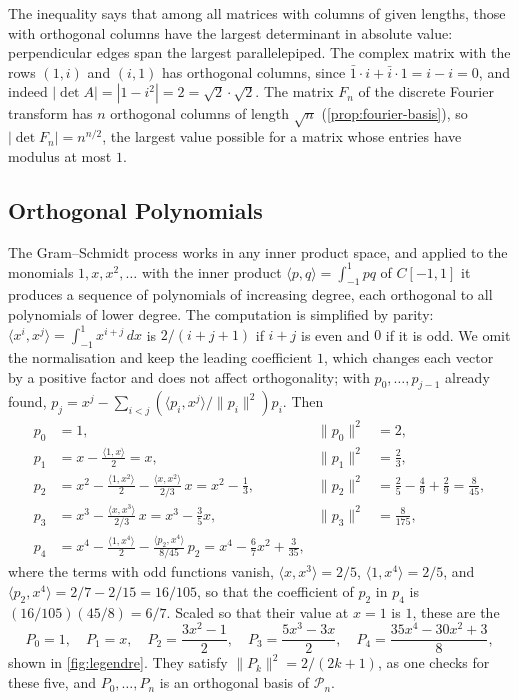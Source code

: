 The inequality says that among all matrices with columns of given lengths, those with orthogonal columns have the largest determinant in absolute value: perpendicular edges span the largest parallelepiped. The complex matrix with the rows $(1,i)$ and $(i,1)$ has orthogonal columns, since $\bar1\cdot i+\bar i\cdot1=i-i=0$, and indeed $|\det A|=|1-i^2|=2=\sqrt2\cdot\sqrt2$. The matrix $F_n$ of the discrete Fourier transform has $n$ orthogonal columns of length $\sqrt n$ (\cref{prop:fourier-basis}), so $|\det F_n|=n^{n/2}$, the largest value possible for a matrix whose entries have modulus at most $1$.

\subsection{Orthogonal Polynomials}
\label{subsec:legendre}

The Gram--Schmidt process works in any inner product space, and applied to the monomials $1,x,x^2,\ldots$ with the inner product $\langle p,q\rangle=\int_{-1}^1pq$ of $C[-1,1]$ it produces a sequence of polynomials of increasing degree, each orthogonal to all polynomials of lower degree. The computation is simplified by parity: $\langle x^i,x^j\rangle=\int_{-1}^1x^{i+j}\,dx$ is $2/(i+j+1)$ if $i+j$ is even and $0$ if it is odd. We omit the normalisation and keep the leading coefficient $1$, which changes each vector by a positive factor and does not affect orthogonality; with $p_0,\ldots,p_{j-1}$ already found, $p_j=x^j-\sum_{i<j}(\langle p_i,x^j\rangle/\|p_i\|^2)p_i$. Then
\[
\begin{aligned}
p_0&=1, & \|p_0\|^2&=2,\\
p_1&=x-\frac{\langle1,x\rangle}2=x, & \|p_1\|^2&=\tfrac23,\\
p_2&=x^2-\frac{\langle1,x^2\rangle}2-\frac{\langle x,x^2\rangle}{2/3}\,x=x^2-\frac13, & \|p_2\|^2&=\tfrac25-\tfrac49+\tfrac29=\tfrac8{45},\\
p_3&=x^3-\frac{\langle x,x^3\rangle}{2/3}\,x=x^3-\frac35x, & \|p_3\|^2&=\tfrac8{175},\\
p_4&=x^4-\frac{\langle1,x^4\rangle}2-\frac{\langle p_2,x^4\rangle}{8/45}\,p_2=x^4-\frac67x^2+\frac3{35} ,
\end{aligned}
\]
where the terms with odd functions vanish, $\langle x,x^3\rangle=2/5$, $\langle1,x^4\rangle=2/5$, and $\langle p_2,x^4\rangle=2/7-2/15=16/105$, so that the coefficient of $p_2$ in $p_4$ is $(16/105)(45/8)=6/7$. Scaled so that their value at $x=1$ is $1$, these are the 
\[
P_0=1,\quad P_1=x,\quad P_2=\frac{3x^2-1}2,\quad P_3=\frac{5x^3-3x}2,\quad P_4=\frac{35x^4-30x^2+3}8,
\]
shown in \cref{fig:legendre}. They satisfy $\|P_k\|^2=2/(2k+1)$, as one checks for these five, and $P_0,\ldots,P_n$ is an orthogonal basis of $\mathcal P_n$.


